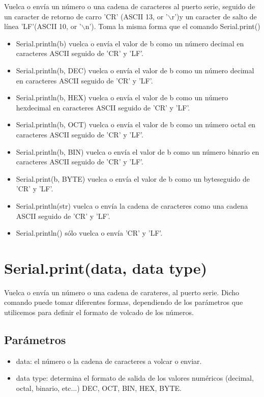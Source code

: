 Vuelca o envía un número o una cadena de caracteres al puerto serie, seguido de un caracter de retorno de carro 'CR' (ASCII 13, or '$\backslash$r')y un caracter de salto de línea 'LF'(ASCII 10, or '$\backslash$n'). Toma la misma forma que el comando Serial.print()
\begin{itemize}
\item Serial.println(b) vuelca o envía el valor de b como un número decimal en caracteres ASCII seguido de 'CR' y 'LF'.
\item Serial.println(b, DEC) vuelca o envía el valor de b como un número decimal en caracteres ASCII seguido de 'CR' y 'LF'.
\item Serial.println(b, HEX) vuelca o envía el valor de b como un número hexdecimal en caracteres ASCII seguido de 'CR' y 'LF'.
\item Serial.println(b, OCT) vuelca o envía el valor de b como un número octal en caracteres ASCII seguido de 'CR' y 'LF'.
\item Serial.println(b, BIN) vuelca o envía el valor de b como un número binario en caracteres ASCII seguido de 'CR' y 'LF'.
\item Serial.print(b, BYTE) vuelca o envía el valor de b como un byteseguido de 'CR' y 'LF'.
\item Serial.println(str) vuelca o envía la cadena de caracteres como una cadena ASCII seguido de 'CR' y 'LF'.
\item Serial.println() sólo vuelca o envía 'CR' y 'LF'.
\end{itemize}
\section{Serial.print(data, data type)}

Vuelca o envía un número o una cadena de carateres, al puerto serie. Dicho comando puede tomar diferentes formas, dependiendo de los parámetros que utilicemos para definir el formato de volcado de los números.
\subsection{Parámetros}
\begin{itemize}
\item data: el número o la cadena de caracteres a volcar o enviar.
\item data type: determina el formato de salida de los valores numéricos (decimal, octal, binario, etc...) DEC, OCT, BIN, HEX, BYTE.
\end{itemize}
